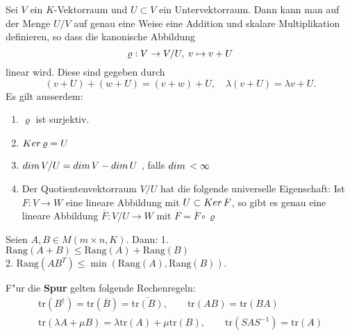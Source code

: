 \documentclass[8pt, a4paper, twocolumn, landscape]{article}
\begin{document}
\begin{theorem}
Sei $V$ ein $K$-Vektorraum und $U \subset V$ ein Untervektorraum. Dann kann man auf der Menge $U/V$ auf genau eine Weise eine Addition und skalare Multiplikation definieren, so dass die kanonische Abbildung 
$$ \varrho : V \to V/U, \thickspace v \mapsto v + U$$
linear wird. Diese sind gegeben durch 
$$
(v+ U) + (w+ U) = (v + w) + U, \quad  \lambda (v+ U) = \lambda v + U.
$$
Es gilt ausserdem:
\begin{enumerate}
\item $\varrho$ ist surjektiv.
\item $Ker \thinspace \varrho = U$
\item $dim \thinspace V/U = dim\thinspace V - dim \thinspace U$ , falls $dim \thinspace < \infty$
\item Der Quotientenvektorraum $V/U$ hat die folgende universelle Eigenschaft: Ist $F: V\to W$ eine lineare Abbildung mit $U \subset Ker \thinspace F$, so gibt es genau eine lineare Abbildung $\overline{F}: V/U \to W$ mit $F = \overline{F}\circ \varrho$ 
\end{enumerate}
\end{theorem}
\begin{lemma}
Seien $A, B \in M( m \times n, K)$. Dann: 1.
$\mathrm{Rang}(A + B) \leq \mathrm{Rang}(A) + \mathrm{Rang}(B)$  \\
2. $\mathrm{Rang}(AB^T) \leq \min( \mathrm{Rang}(A), \mathrm{Rang}(B))$.
\end{lemma}
\begin{lemma}
F"ur die \textbf{Spur} gelten folgende Rechenregeln:
\begin{gather*}
\mathrm{tr}(B^\dagger) = \mathrm{tr}(\overline{B}) = \overline{\mathrm{tr}({B})}, \qquad
\mathrm{tr}(AB) = \mathrm{tr}(BA) \\
\mathrm{tr}(\lambda A + \mu B) = \lambda \mathrm{tr}(A )+ \mu \mathrm{tr}(B), \qquad
\mathrm{tr}(S A S^{-1}) = \mathrm{tr}(A)
\end{gather*}



\end{lemma}
\end{document}
